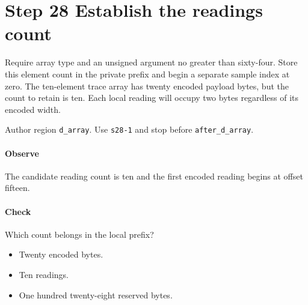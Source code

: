 \section{Step 28 Establish the readings count}\label{cbor-s28}
Require array type and an unsigned argument no greater than sixty-four. Store this element count in the private prefix and begin a separate sample index at zero. The ten-element trace array has twenty encoded payload bytes, but the count to retain is ten. Each local reading will occupy two bytes regardless of its encoded width.

Author region \texttt{d\_array}. Use \texttt{s28-1} and stop before \texttt{after\_d\_array}.

\paragraph{Observe} The candidate reading count is ten and the first encoded reading begins at offset fifteen.

\paragraph{Check} Which count belongs in the local prefix?
\begin{itemize}
\item[A.] Twenty encoded bytes.
\item[B.] Ten readings.
\item[C.] One hundred twenty-eight reserved bytes.
\end{itemize}
